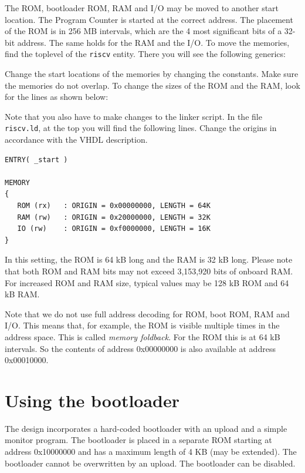 \documentclass[12pt]{article}
\begin{document}
The ROM, bootloader ROM, RAM and I/O may be moved to another start location. The Program Counter is started at the correct address. The placement of the ROM is in 256 MB intervals, which are the 4 most significant bits of a 32-bit address. The same holds for the RAM and the I/O. To move the memories, find the toplevel of the \lstinline|riscv| entity. There you will see the following generics:



Change the start locations of the memories by changing the constants. Make sure the memories do not overlap. To change the sizes of the ROM and the RAM, look for the lines as shown below:



Note that you also have to make changes to the linker script. In the file \lstinline|riscv.ld|, at the top you will find the following lines. Change the origins in accordance with the VHDL description.

\begin{lstlisting}
ENTRY( _start )

MEMORY
{
   ROM (rx)   : ORIGIN = 0x00000000, LENGTH = 64K
   RAM (rw)   : ORIGIN = 0x20000000, LENGTH = 32K
   IO (rw)    : ORIGIN = 0xf0000000, LENGTH = 16K
}
\end{lstlisting}

In this setting, the ROM is 64 kB long and the RAM is 32 kB long. Please note that both ROM and RAM bits may not exceed 3,153,920 bits of onboard RAM. For increased ROM and RAM size, typical values may be 128 kB ROM and 64 kB RAM.

Note that we do not use full address decoding for ROM, boot ROM, RAM and I/O. This means that, for example, the ROM is visible multiple times in the address space. This is called \emph{memory foldback}. For the ROM this is at 64 kB intervals. So the contents of address 0x00000000 is also available at address 0x00010000.

\section{Using the bootloader}
\label{sec:bootloader}
The design incorporates a hard-coded bootloader with an upload and a simple monitor program. The bootloader is placed in a separate ROM starting at address 0x10000000 and has a maximum length of 4 KB (may be extended). The bootloader cannot be overwritten by an upload. The bootloader can be disabled.
\end{document}
